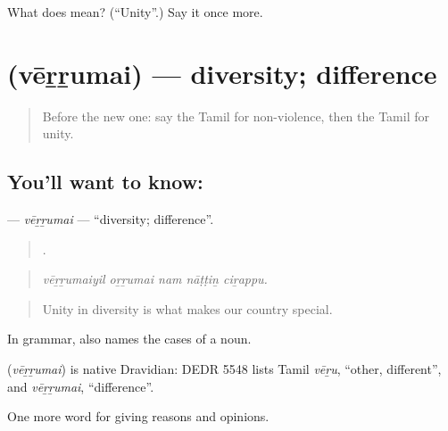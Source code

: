 \begin{tcolorbox}[breakable,colback=teal!4,colframe=teal!35!black,title={Before you move on}]
What does  mean? (\textquotedblleft{}Unity\textquotedblright{}.) Say it once more.
\end{tcolorbox}
\section[\texorpdfstring{\ta{வேற்றுமை} (vēṟṟumai)}{வேற்றுமை (vēṟṟumai)}]{ (vēṟṟumai) — diversity; difference}

\label{lesson:TA-C377-verrumai}



\begin{quote}
Before the new one: say the Tamil for non-violence, then the Tamil for unity.
\end{quote}

\subsection*{You'll want to know: }
\textbf{} — \emph{vēṟṟumai} — \textquotedblleft{}diversity; difference\textquotedblright{}.

\begin{quote}
    .
\end{quote}

\begin{quote}
\emph{vēṟṟumaiyil oṟṟumai nam nāṭṭiṉ ciṟappu.}
\end{quote}

\begin{quote}
Unity in diversity is what makes our country special.
\end{quote}

In grammar,  also names the cases of a noun.

\begin{cousinweb}
\textbf{} (\emph{vēṟṟumai}) is native Dravidian: DEDR 5548 lists Tamil \emph{vēṟu}, \textquotedblleft{}other, different\textquotedblright{}, and \emph{vēṟṟumai}, \textquotedblleft{}difference\textquotedblright{}.
\end{cousinweb}

\begin{grammarlens}[title={What you've built}]
One more word for giving reasons and opinions.
\end{grammarlens}

